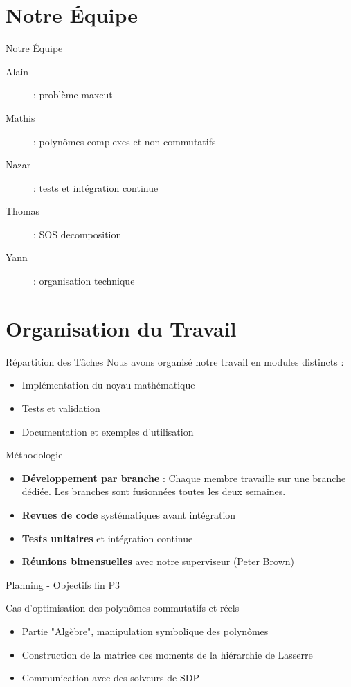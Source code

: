 \documentclass{beamer}
\begin{document}
\section{Notre Équipe}

\begin{frame}{Notre Équipe}
\begin{description}
    \item[Alain]: problème maxcut
    \item[Mathis]: polynômes complexes et non commutatifs
    \item[Nazar]: tests et intégration continue
    \item[Thomas]: SOS decomposition
    \item[Yann]: organisation technique
\end{description}
\end{frame}

\section{Organisation du Travail}

\begin{frame}{Répartition des Tâches}
Nous avons organisé notre travail en modules distincts :
\begin{itemize}
    \item Implémentation du noyau mathématique
    \item Tests et validation
    \item Documentation et exemples d'utilisation
\end{itemize}
\end{frame}

\begin{frame}{Méthodologie}
\begin{itemize}
    \item \textbf{Développement par branche} : Chaque membre travaille sur une branche dédiée. Les branches sont fusionnées toutes les deux semaines.
    \item \textbf{Revues de code} systématiques avant intégration
    \item \textbf{Tests unitaires} et intégration continue
    \item \textbf{Réunions bimensuelles} avec notre superviseur (Peter Brown)
\end{itemize}
\end{frame}

\begin{frame}{Planning - Objectifs fin P3}

Cas d'optimisation des polynômes commutatifs et réels
\begin{itemize}
    \item[\checkmark] Partie "Algèbre", manipulation symbolique des polynômes
    \item[\checkmark] Construction de la matrice des moments de la hiérarchie de Lasserre
    \item[\checkmark] Communication avec des solveurs de SDP
\end{itemize}
\end{frame}
\end{document}
